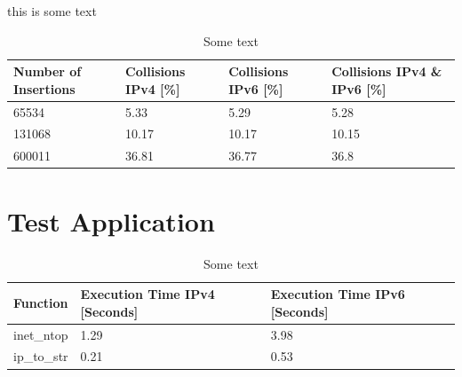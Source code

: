 \begin{algorithm}[h!]
    
    \label{alg:ip_hashtable}
    \caption[IP Hashtable]{this is some text}
\end{algorithm}

\begin{table}[h!]
    \label{tab:hash_col}
    \centering
    \small
    \begin{tabular}{llll}
        \toprule
        \textbf{Number of Insertions} & \textbf{Collisions IPv4 [\%]} & \textbf{Collisions IPv6 [\%]} & \textbf{Collisions IPv4 \& IPv6 [\%]}\\ \midrule 
        65534 & 5.33 & 5.29 & 5.28 \\ \midrule
        131068 & 10.17 & 10.17 & 10.15 \\ \midrule
        600011 & 36.81 & 36.77 & 36.8 \\
        \bottomrule
    \end{tabular}
    \caption[Hash Collisions]{Some text}
\end{table}

\section{Test Application}

\begin{table}[h!]
    \label{tab:ip_str}
    \centering
    \small
    \begin{tabular}{lll}
        \toprule
        \textbf{Function} & \textbf{Execution Time IPv4 [Seconds]} & \textbf{Execution Time IPv6 [Seconds]} \\ \midrule 
        inet\_ntop & 1.29 & 3.98 \\ \midrule
        ip\_to\_str & 0.21 & 0.53 \\ 
        \bottomrule
    \end{tabular}
    \caption[IP String Conversion]{Some text}
\end{table}






